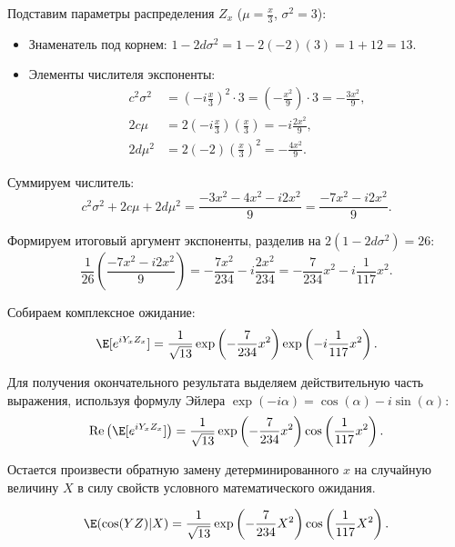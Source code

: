 \begin{Solution}
    Подставим параметры распределения $Z_x$ ($\mu = \frac{x}{3}$, $\sigma^2 = 3$):
    \begin{itemize}
        \item Знаменатель под корнем: $1 - 2d\sigma^2 = 1 - 2(-2)(3) = 1 + 12 = 13$.
        \item Элементы числителя экспоненты:
        \begin{align*}
            c^2\sigma^2 &= \left(-i\frac{x}{3}\right)^2 \cdot 3 = \left(-\frac{x^2}{9}\right) \cdot 3 = -\frac{3x^2}{9}, \\
            2c\mu &= 2\left(-i\frac{x}{3}\right)\left(\frac{x}{3}\right) = -i\frac{2x^2}{9}, \\
            2d\mu^2 &= 2(-2)\left(\frac{x}{3}\right)^2 = -\frac{4x^2}{9}.
        \end{align*}
    \end{itemize}

    Суммируем числитель:
    \[
    c^2\sigma^2 + 2c\mu + 2d\mu^2 = \frac{-3x^2 - 4x^2 - i 2x^2}{9} = \frac{-7x^2 - i 2x^2}{9}.
    \]

    Формируем итоговый аргумент экспоненты, разделив на $2(1 - 2d\sigma^2) = 26$:
    \[
    \frac{1}{26} \left( \frac{-7x^2 - i 2x^2}{9} \right) = -\frac{7x^2}{234} - i\frac{2x^2}{234} = -\frac{7}{234}x^2 - i\frac{1}{117}x^2.
    \]

    Собираем комплексное ожидание:
    \[
    \E[e^{i Y_x Z_x}] = \frac{1}{\sqrt{13}} \exp\left( -\frac{7}{234}x^2 \right) \exp\left( -i\frac{1}{117}x^2 \right).
    \]

    Для получения окончательного результата выделяем действительную часть выражения, используя формулу Эйлера $\exp(-i\alpha) = \cos(\alpha) - i\sin(\alpha)$:
    \[
    \text{Re}\left( \E[e^{i Y_x Z_x}] \right) = \frac{1}{\sqrt{13}} \exp\left( -\frac{7}{234}x^2 \right) \cos\left( \frac{1}{117}x^2 \right).
    \]

    Остается произвести обратную замену детерминированного $x$ на случайную величину $X$ в силу свойств условного математического ожидания.

\end{Solution}

\begin{Answer}
    \[
    \E(\cos(YZ)|X) = \frac{1}{\sqrt{13}} \exp\left( -\frac{7}{234}X^2 \right) \cos\left( \frac{1}{117}X^2 \right).
    \]
\end{Answer}
